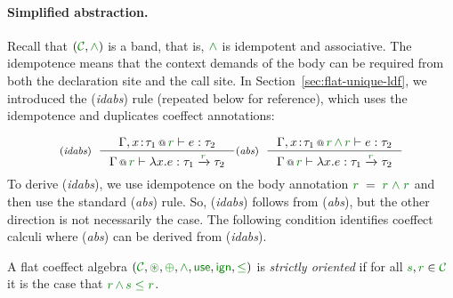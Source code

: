 \paragraph{Simplified abstraction.}
Recall that $(\C, \czip)$ is a band, that is, $\czip$  is idempotent and associative. The
idempotence means that the context demands of the body can be required from both the
declaration site and the call site. In Section~\ref{sec:flat-unique-ldf}, we introduced the
(\emph{idabs}) rule (repeated below for reference), which uses the idempotence and duplicates
coeffect annotations:

\begin{equation*}
\tyrule{idabs}
  {\coctx{\Gamma, x\!:\!\tau_1}{\cclrd{r}} \vdash e : \tau_2}
  {\coctx{\Gamma}{\cclrd{r}} \vdash \lambda x.e : \tau_1 \xrightarrow{\cclrd{r}} \tau_2 }
\tyrule{abs}
  {\coctx{\Gamma, x\!:\!\tau_1}{\cclrd{r}\,\czip\,\cclrd{r}} \vdash e : \tau_2}
  {\coctx{\Gamma}{\cclrd{r}} \vdash \lambda x.e : \tau_1 \xrightarrow{\cclrd{r}} \tau_2 }
\end{equation*}
%
To derive (\emph{idabs}), we use idempotence on the body annotation $\cclrd{r}\;=\;\cclrd{r}\;\czip\;\cclrd{r}$
and then use the standard (\emph{abs}) rule. So, (\emph{idabs}) follows from (\emph{abs}),
but the other direction is not necessarily the case. The following condition identifies
coeffect calculi where (\emph{abs}) can be derived from (\emph{idabs}).

\begin{definition}
A flat coeffect algebra $(\C, \cseq, \cpar, \czip, \cunit, \czero, \cleq)$ is \emph{strictly oriented} if for all
$\cclrd{s}, \cclrd{r} \in \C$ it is the case that $\cclrd{r} \,\czip\, \cclrd{s} \;\cleq\; \cclrd{r}$.
\end{definition}


